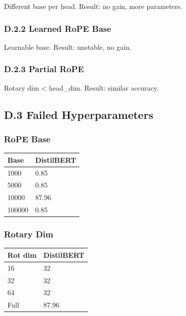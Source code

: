 Different base per head. Result: no gain, more parameters.

\subsubsection{D.2.2 Learned RoPE Base}

Learnable base. Result: unstable, no gain.

\subsubsection{D.2.3 Partial RoPE}

Rotary dim \textless{} head\_dim. Result: similar accuracy.

\subsection{D.3 Failed Hyperparameters}

\subsubsection{RoPE Base}

\begin{table}[H]
\centering
\small
\begin{tabular}{ll}
\toprule
\textbf{Base} & \textbf{DistilBERT} \\
\midrule
1000 & 0.85 \\
5000 & 0.85 \\
10000 & 87.96 \\
100000 & 0.85 \\
\bottomrule
\end{tabular}
\end{table}

\subsubsection{Rotary Dim}

\begin{table}[H]
\centering
\small
\begin{tabular}{ll}
\toprule
\textbf{Rot dim} & \textbf{DistilBERT} \\
\midrule
16 & 32 \\
32 & 32 \\
64 & 32 \\
Full & 87.96 \\
\bottomrule
\end{tabular}
\end{table}

